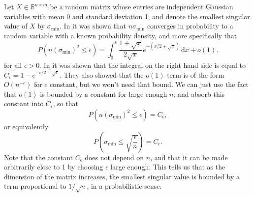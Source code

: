 \documentclass{article}
\begin{document}
Let $X \in \mathbb{R}^{n \times m}$ be a random matrix whose entries are independent Gaussian variables with mean 0 and standard deviation 1, and denote the smallest singular value of $X$ by $\sigma_{\text{min}}$. In \cite[corollary 3.1]{1988-edelman-EigenvaluesConditionNumbers} it was shown that $n \sigma_{\text{min}}$ converges in probability to a random variable with a known probability density, and more specifically that
\[
  P(n(\sigma_{\text{min}})^2 \le \epsilon) = \int_0^\epsilon \frac{1 + \sqrt{x}}{2\sqrt{x}} e^{-(x/2 + \sqrt{x})} \, \mathrm{d}x + o(1).
\]
for all $\epsilon > 0$. In \cite{2009-tao-RandomMatricesDistribution} it was shown that the integral on the right hand side is equal to $C_\epsilon = 1 - e^{-\epsilon/2 - \sqrt{\epsilon}}$. They also showed that the $o(1)$ term is of the form $O(n^{-c})$ for $c$ constant, but we won't need that bound. We can just use the fact that $o(1)$ is bounded by a constant for large enough $n$, and absorb this constant into $C_\epsilon$, so that 
\[
  P(n(\sigma_{\text{min}})^2 \le \epsilon) = C_\epsilon,
\]
or equivalently
\[
  P\left(\sigma_{\text{min}} \le \sqrt{\frac{\epsilon}{n}} \right) = C_\epsilon.
\]
Note that the constant $C_\epsilon$ does not depend on $n$, and that it can be made arbitrarily close to 1 by choosing $\epsilon$ large enough. This tells us that as the dimension of the matrix increases, the smallest singular value is bounded by a term proportional to $1/\sqrt{n}$, in a probabilistic sense.
\printbibliography
\end{document}
